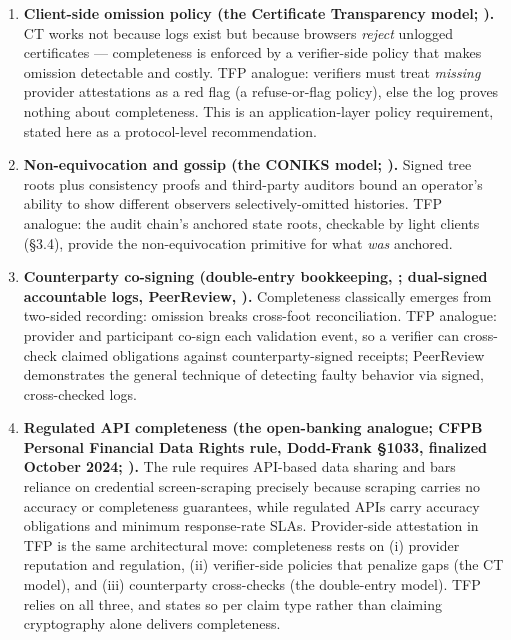 \documentclass[
]{article}
\begin{document}
\begin{enumerate}
\def\labelenumi{\arabic{enumi}.}
\item
  \textbf{Client-side omission policy (the Certificate Transparency
  model; ).} CT works not because logs exist but because browsers
  \emph{reject} unlogged certificates --- completeness is enforced by a
  verifier-side policy that makes omission detectable and costly. TFP
  analogue: verifiers must treat \emph{missing} provider attestations as
  a red flag (a refuse-or-flag policy), else the log proves nothing
  about completeness. This is an application-layer policy requirement,
  stated here as a protocol-level recommendation.
\item
  \textbf{Non-equivocation and gossip (the CONIKS model; ).} Signed tree
  roots plus consistency proofs and third-party auditors bound an
  operator's ability to show different observers selectively-omitted
  histories. TFP analogue: the audit chain's anchored state roots,
  checkable by light clients (§3.4), provide the non-equivocation
  primitive for what \emph{was} anchored.
\item
  \textbf{Counterparty co-signing (double-entry bookkeeping, ;
  dual-signed accountable logs, PeerReview, ).} Completeness classically
  emerges from two-sided recording: omission breaks cross-foot
  reconciliation. TFP analogue: provider and participant co-sign each
  validation event, so a verifier can cross-check claimed obligations
  against counterparty-signed receipts; PeerReview demonstrates the
  general technique of detecting faulty behavior via signed,
  cross-checked logs.
\item
  \textbf{Regulated API completeness (the open-banking analogue; CFPB
  Personal Financial Data Rights rule, Dodd-Frank §1033, finalized
  October 2024; ).} The rule requires API-based data sharing and bars
  reliance on credential screen-scraping precisely because scraping
  carries no accuracy or completeness guarantees, while regulated APIs
  carry accuracy obligations and minimum response-rate SLAs.
  Provider-side attestation in TFP is the same architectural move:
  completeness rests on (i) provider reputation and regulation, (ii)
  verifier-side policies that penalize gaps (the CT model), and (iii)
  counterparty cross-checks (the double-entry model). TFP relies on all
  three, and states so per claim type rather than claiming cryptography
  alone delivers completeness.
\end{enumerate}
\end{document}
